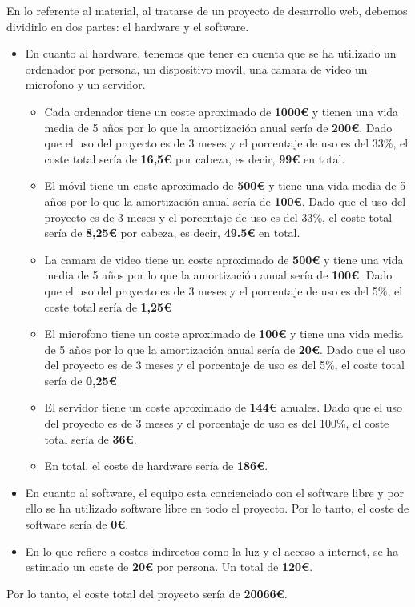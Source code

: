\documentclass{report}
\begin{document}
{            En lo referente al material, al tratarse de un proyecto de desarrollo web, debemos dividirlo en dos partes: el hardware y el software.\\
            \begin{itemize}
                \item En cuanto al hardware, tenemos que tener en cuenta que se ha utilizado un ordenador por persona, un dispositivo movil, una camara de video un microfono y un servidor.\\
                \begin{itemize}
                    \item Cada ordenador tiene un coste aproximado de \textbf{1000€} y tienen una vida media de 5 años por lo que la amortización anual sería de \textbf{200€}. Dado que el uso del proyecto es de 3 meses y el porcentaje de uso es del 33\%, el coste total sería de \textbf{16,5€} por cabeza, es decir, \textbf{99€} en total.
                    \item El móvil tiene un coste aproximado de \textbf{500€} y tiene una vida media de 5 años por lo que la amortización anual sería de \textbf{100€}. Dado que el uso del proyecto es de 3 meses y el porcentaje de uso es del 33\%, el coste total sería de \textbf{8,25€} por cabeza, es decir, \textbf{49.5€} en total.
                    \item La camara de video tiene un coste aproximado de \textbf{500€} y tiene una vida media de 5 años por lo que la amortización anual sería de \textbf{100€}. Dado que el uso del proyecto es de 3 meses y el porcentaje de uso es del 5\%, el coste total sería de \textbf{1,25€}
                    \item El microfono tiene un coste aproximado de \textbf{100€} y tiene una vida media de 5 años por lo que la amortización anual sería de \textbf{20€}. Dado que el uso del proyecto es de 3 meses y el porcentaje de uso es del 5\%, el coste total sería de \textbf{0,25€}
                    \item El servidor tiene un coste aproximado de \textbf{144€} anuales. Dado que el uso del proyecto es de 3 meses y el porcentaje de uso es del 100\%, el coste total sería de \textbf{36€}.
                    \item En total, el coste de hardware sería de \textbf{186€}.
                \end{itemize}

                \item En cuanto al software, el equipo esta concienciado con el software libre y por ello se ha utilizado software libre en todo el proyecto. Por lo tanto, el coste de software sería de \textbf{0€}.\\

                \item En lo que refiere a costes indirectos como la luz y el acceso a internet, se ha estimado un coste de \textbf{20€} por persona. Un total de \textbf{120€}.\\
            \end{itemize}
            Por lo tanto, el coste total del proyecto sería de \textbf{20066€}.
        }
\end{document}
